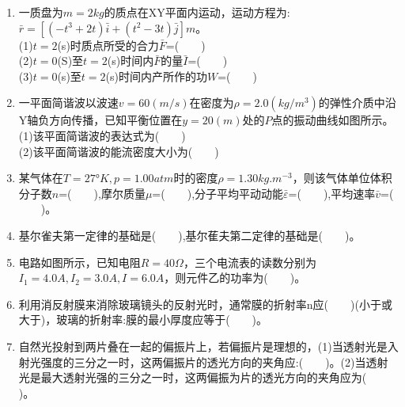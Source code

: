 \begin{enumerate}
\item 一质盘为$m=2kg$的质点在XY平面内运动，运动方程为:$\bar r =[(-t^3+2t)\bar i+(t^2-3t)\bar j]m$。\\
(1)$t=2$(s)时质点所受的合力$\bar F$=($\qquad$)\\
(2)$t=0$(S)至$t=2$(s)时间内$\bar F$的量$\bar I$=($\qquad$)\\
(3)$t=0$(s)至$t=2$(s)时间内产所作的功$W$=($\qquad$)
\item 一平面简谐波以波速$v=60(m/s)$在密度为$\rho=2.0(kg/m^3)$的弹性介质中沿Y轴负方向传播，已知平衡位置在$y=20(m)$处的$P$点的振动曲线如图所示。\\
(1)该平面简谐波的表达式为($\qquad$)\\
(2)该平面简谐波的能流密度大小为($\qquad$)
\item 某气体在$T=27$°$K,p=1.00atm$时的密度$\rho=1.30kg.m^{-3}$，则该气体单位体积分子数$n$=($\qquad$),摩尔质量$\mu$=($\qquad$),分子平均平动动能$\bar \varepsilon$=($\qquad$),平均速率$\bar v$=($\qquad$)。
\item 基尔雀夫第一定律的基础是($\qquad$),基尔萑夫第二定律的基础是($\qquad$)。
\item 电路如图所示，已知电阻$R=40\Omega$，三个电流表的读数分别为$I_1=4.0A,I_2=3.0A,I=6.0A$，则元件乙的功率为($\qquad$)。
\item 利用消反射膜来消除玻璃镜头的反射光时，通常膜的折射率n应($\qquad$)(小于或大于)，玻璃的折射率:膜的最小厚度应等于($\qquad$)。
\item 自然光投射到两片叠在一起的偏振片上，若偏振片是理想的，(1)当透射光是入射光强度的三分之一时，这两偏振片的透光方向的夹角应:($\qquad$)。(2)当透射光是最大透射光强的三分之一时，这两偏振为片的透光方向的夹角应为($\qquad$)。
\ite
\end{enumerate}
